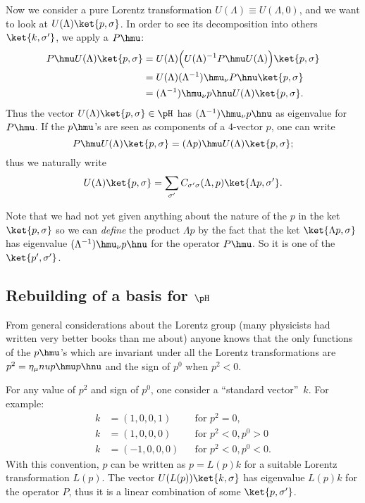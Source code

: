 Now we consider a pure Lorentz transformation $U(\Lambda)\equiv U(\Lambda,0)$, and we want to look at $U(\Lambda)\ket{p,\sigma}$. In order to see its decomposition into others $\ket{k,\sigma'}$, we apply a $P\hmu$:
\begin{equation}
\begin{split}  
  P\hmu U(\Lambda)\ket{p,\sigma}&=U(\Lambda)\Big( U(\Lambda)^{-1} P\hmu U(\Lambda)  \Big)\ket{p,\sigma}\\
                                &=U(\Lambda) {(\Lambda^{-1})}\hmu_{\nu} P\hnu \ket{p,\sigma}\\
				&=(\Lambda^{-1})\hmu_{\nu} p\hnu U(\Lambda)\ket{p,\sigma}.
\end{split}				
\end{equation}
Thus the vector $U(\Lambda)\ket{p,\sigma}\in\pH$ has $(\Lambda^{-1})\hmu_{\nu} p\hnu$ as eigenvalue for $P\hmu$. If the $p\hmu$'s are seen as components of a $4$-vector $p$, one can write
\[
    P\hmu U(\Lambda)\ket{p,\sigma}=(\Lambda p)\hmu U(\Lambda)\ket{p,\sigma};
\]    
     thus we naturally write  
\begin{equation}     
  U(\Lambda)\ket{p,\sigma}=\sum_{\sigma'}C_{\sigma'\sigma}(\Lambda,p)\ket{\Lambda p,\sigma'}.
\end{equation}
       

Note that we had not yet given anything about the nature of the $p$ in the ket $\ket{p,\sigma}$ so we can \emph{define} the product $\Lambda p$ by the fact that the ket $\ket{\Lambda p,\sigma}$ has eigenvalue $(\Lambda^{-1})\hmu_{\nu} p\hnu$ for the operator $P\hmu$. So it is one of the $\ket{p',\sigma'}$.

\subsection{Rebuilding of a basis for \texorpdfstring{$\pH$}{H}}

From general considerations about the Lorentz group (many physicists had written very better books than me about) anyone knows that the only functions of the $p\hmu$'s  which are invariant under all the Lorentz transformations are $p^2=\eta_{\mu}nu p\hmu p\hnu$ and the sign of $p^0$ when $p^2< 0$.

For any value of $p^2$ and sign of $p^0$, one consider a ``standard vector''\ $k$. For example:
\begin{subequations}
\begin{align}
   k&=(1,0,0,1)&&\text{for }p^2=0,\\
   k&=(1,0,0,0)&&\text{for }p^2<0,p^0>0\\
   k&=(-1,0,0,0)&&\text{for }p^2<0,p^0<0.
\end{align}   
\end{subequations}
With this convention, $p$ can be written as $p=L(p)k$ for a suitable Lorentz transformation $L(p)$. The vector $U(L(p))\ket{k,\sigma}$ has eigenvalue $L(p)k$ for the operator $P$, thus it is a linear combination of some $\ket{p,\sigma'}$.

